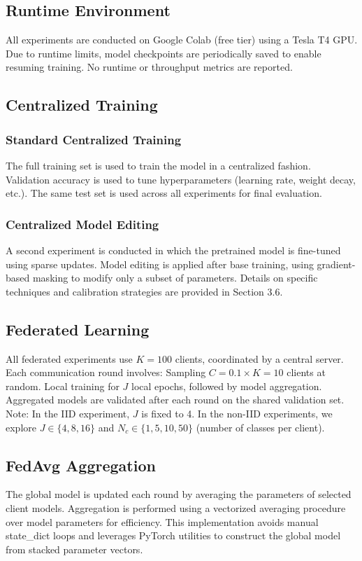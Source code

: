 \documentclass[10pt,twocolumn,letterpaper]{article}
\begin{document}
\subsection{Runtime Environment}
All experiments are conducted on Google Colab (free tier) using a Tesla T4 GPU. Due to runtime limits, model checkpoints are periodically saved to enable resuming training. No runtime or throughput metrics are reported.



\subsection{Centralized Training}
\subsubsection{Standard Centralized Training}
The full training set is used to train the model in a centralized fashion. Validation accuracy is used to tune hyperparameters (learning rate, weight decay, etc.). The same test set is used across all experiments for final evaluation.

\subsubsection{Centralized Model Editing}
A second experiment is conducted in which the pretrained model is fine-tuned using sparse updates. Model editing is applied after base training, using gradient-based masking to modify only a subset of parameters. Details on specific techniques and calibration strategies are provided in Section 3.6.



\subsection{Federated Learning}
All federated experiments use $K = 100$ clients, coordinated by a central server. Each communication round involves: Sampling $C = 0.1 \times K = 10$ clients at random. Local training for $J$ local epochs, followed by model aggregation. Aggregated models are validated after each round on the shared validation set. Note: In the IID experiment, $J$ is fixed to 4. In the non-IID experiments, we explore $J \in \{4, 8, 16\}$ and $N_c \in \{1, 5, 10, 50\}$ (number of classes per client).



\subsection{FedAvg Aggregation}
The global model is updated each round by averaging the parameters of selected client models. Aggregation is performed using a vectorized averaging procedure over model parameters for efficiency. This implementation avoids manual state\_dict loops and leverages PyTorch utilities to construct the global model from stacked parameter vectors.
\end{document}
